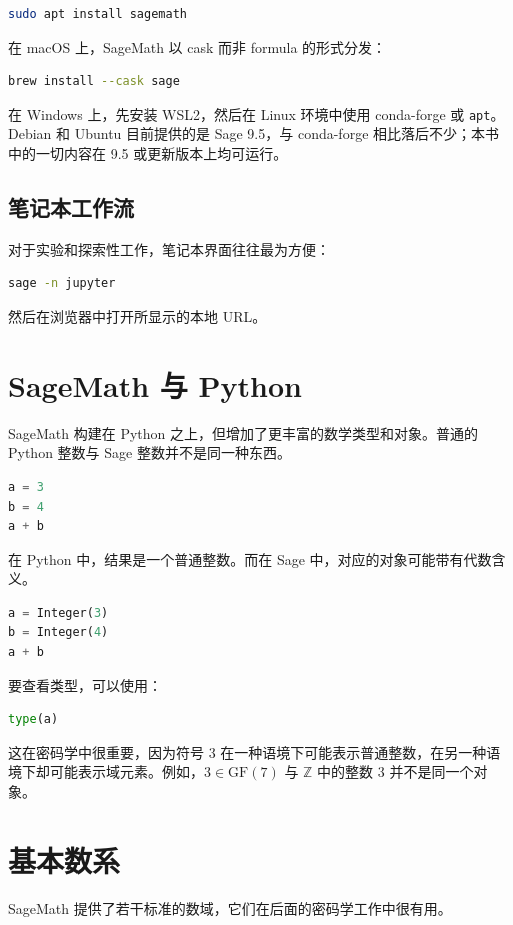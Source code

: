 \begin{lstlisting}[language=bash]
sudo apt install sagemath
\end{lstlisting}

在 macOS 上，SageMath 以 cask 而非 formula 的形式分发：

\begin{lstlisting}[language=bash]
brew install --cask sage
\end{lstlisting}

在 Windows 上，先安装 WSL2，然后在 Linux 环境中使用 conda-forge 或 \texttt{apt}。Debian 和 Ubuntu 目前提供的是 Sage 9.5，与 conda-forge 相比落后不少；本书中的一切内容在 9.5 或更新版本上均可运行。

\subsection{笔记本工作流}
对于实验和探索性工作，笔记本界面往往最为方便：

\begin{lstlisting}[language=bash]
sage -n jupyter
\end{lstlisting}

然后在浏览器中打开所显示的本地 URL。

\section{SageMath 与 Python}
SageMath 构建在 Python 之上，但增加了更丰富的数学类型和对象。普通的 Python 整数与 Sage 整数并不是同一种东西。

\begin{lstlisting}[language=Python]
a = 3
b = 4
a + b
\end{lstlisting}

在 Python 中，结果是一个普通整数。而在 Sage 中，对应的对象可能带有代数含义。

\begin{lstlisting}[language=Python]
a = Integer(3)
b = Integer(4)
a + b
\end{lstlisting}

要查看类型，可以使用：

\begin{lstlisting}[language=Python]
type(a)
\end{lstlisting}

这在密码学中很重要，因为符号 $3$ 在一种语境下可能表示普通整数，在另一种语境下却可能表示域元素。例如，$3 \in \mathrm{GF}(7)$ 与 $\mathbb{Z}$ 中的整数 $3$ 并不是同一个对象。

\section{基本数系}
SageMath 提供了若干标准的数域，它们在后面的密码学工作中很有用。

